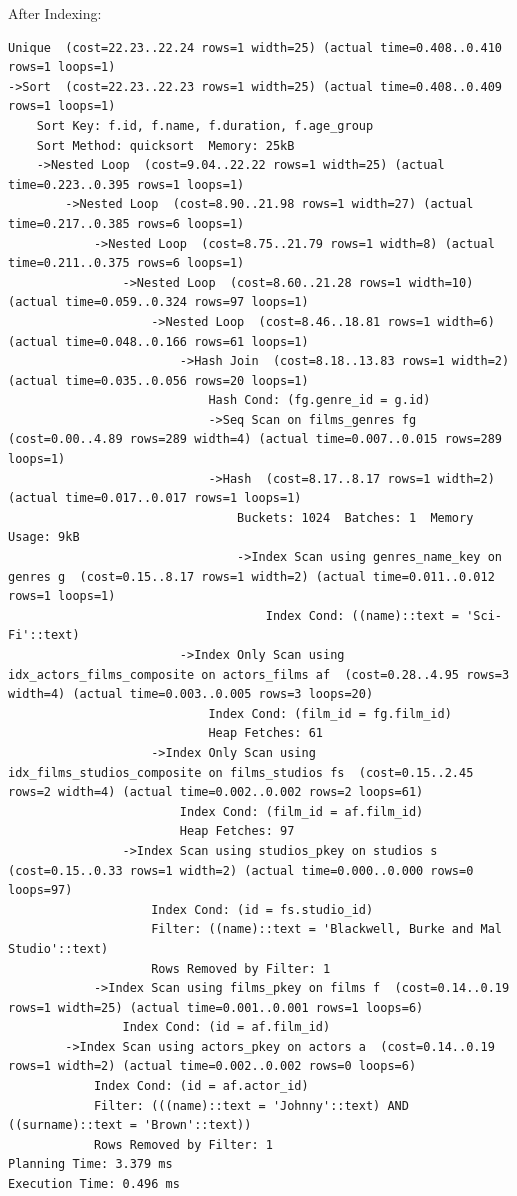 \documentclass[11pt, a4paper]{article}
\begin{document}
After Indexing:
\begin{lstlisting}
Unique  (cost=22.23..22.24 rows=1 width=25) (actual time=0.408..0.410 rows=1 loops=1)
->Sort  (cost=22.23..22.23 rows=1 width=25) (actual time=0.408..0.409 rows=1 loops=1)
    Sort Key: f.id, f.name, f.duration, f.age_group
    Sort Method: quicksort  Memory: 25kB
    ->Nested Loop  (cost=9.04..22.22 rows=1 width=25) (actual time=0.223..0.395 rows=1 loops=1)
        ->Nested Loop  (cost=8.90..21.98 rows=1 width=27) (actual time=0.217..0.385 rows=6 loops=1)
            ->Nested Loop  (cost=8.75..21.79 rows=1 width=8) (actual time=0.211..0.375 rows=6 loops=1)
                ->Nested Loop  (cost=8.60..21.28 rows=1 width=10) (actual time=0.059..0.324 rows=97 loops=1)
                    ->Nested Loop  (cost=8.46..18.81 rows=1 width=6) (actual time=0.048..0.166 rows=61 loops=1)
                        ->Hash Join  (cost=8.18..13.83 rows=1 width=2) (actual time=0.035..0.056 rows=20 loops=1)
                            Hash Cond: (fg.genre_id = g.id)
                            ->Seq Scan on films_genres fg  (cost=0.00..4.89 rows=289 width=4) (actual time=0.007..0.015 rows=289 loops=1)
                            ->Hash  (cost=8.17..8.17 rows=1 width=2) (actual time=0.017..0.017 rows=1 loops=1)
                                Buckets: 1024  Batches: 1  Memory Usage: 9kB
                                ->Index Scan using genres_name_key on genres g  (cost=0.15..8.17 rows=1 width=2) (actual time=0.011..0.012 rows=1 loops=1)
                                    Index Cond: ((name)::text = 'Sci-Fi'::text)
                        ->Index Only Scan using idx_actors_films_composite on actors_films af  (cost=0.28..4.95 rows=3 width=4) (actual time=0.003..0.005 rows=3 loops=20)
                            Index Cond: (film_id = fg.film_id)
                            Heap Fetches: 61
                    ->Index Only Scan using idx_films_studios_composite on films_studios fs  (cost=0.15..2.45 rows=2 width=4) (actual time=0.002..0.002 rows=2 loops=61)
                        Index Cond: (film_id = af.film_id)
                        Heap Fetches: 97
                ->Index Scan using studios_pkey on studios s  (cost=0.15..0.33 rows=1 width=2) (actual time=0.000..0.000 rows=0 loops=97)
                    Index Cond: (id = fs.studio_id)
                    Filter: ((name)::text = 'Blackwell, Burke and Mal Studio'::text)
                    Rows Removed by Filter: 1
            ->Index Scan using films_pkey on films f  (cost=0.14..0.19 rows=1 width=25) (actual time=0.001..0.001 rows=1 loops=6)
                Index Cond: (id = af.film_id)
        ->Index Scan using actors_pkey on actors a  (cost=0.14..0.19 rows=1 width=2) (actual time=0.002..0.002 rows=0 loops=6)
            Index Cond: (id = af.actor_id)
            Filter: (((name)::text = 'Johnny'::text) AND ((surname)::text = 'Brown'::text))
            Rows Removed by Filter: 1
Planning Time: 3.379 ms
Execution Time: 0.496 ms
\end{lstlisting}
\end{document}

